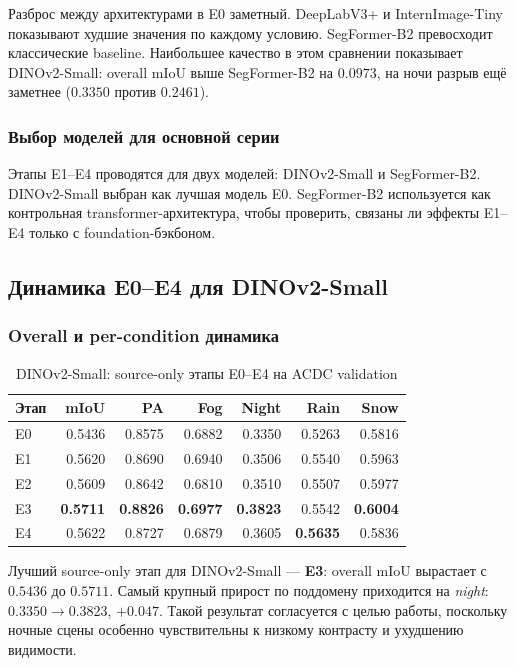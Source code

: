 \documentclass[14pt,a4paper]{extarticle}
\begin{document}
Разброс между архитектурами в E0 заметный. DeepLabV3+ и InternImage-Tiny показывают худшие значения по каждому условию. SegFormer-B2 превосходит классические baseline. Наибольшее качество в этом сравнении показывает DINOv2-Small: overall mIoU выше SegFormer-B2 на $0.0973$, на ночи разрыв ещё заметнее ($0.3350$ против $0.2461$).

\subsubsection{Выбор моделей для основной серии}

Этапы E1--E4 проводятся для двух моделей: DINOv2-Small и SegFormer-B2. DINOv2-Small выбран как лучшая модель E0. SegFormer-B2 используется как контрольная transformer-архитектура, чтобы проверить, связаны ли эффекты E1--E4 только с foundation-бэкбоном.

\subsection{Динамика E0--E4 для DINOv2-Small}

\subsubsection{Overall и per-condition динамика}

\begin{table}[H]
    \centering
    \caption{DINOv2-Small: source-only этапы E0--E4 на ACDC validation}
    \label{tab:dinov2_e0_e4_metrics}
    \small
    \begin{tabular}{lrrrrrr}
        \toprule
        Этап & mIoU & PA & Fog & Night & Rain & Snow \\
        \midrule
        E0 & 0.5436 & 0.8575 & 0.6882 & 0.3350 & 0.5263 & 0.5816 \\
        E1 & 0.5620 & 0.8690 & 0.6940 & 0.3506 & 0.5540 & 0.5963 \\
        E2 & 0.5609 & 0.8642 & 0.6810 & 0.3510 & 0.5507 & 0.5977 \\
        E3 & \textbf{0.5711} & \textbf{0.8826} & \textbf{0.6977} & \textbf{0.3823} & 0.5542 & \textbf{0.6004} \\
        E4 & 0.5622 & 0.8727 & 0.6879 & 0.3605 & \textbf{0.5635} & 0.5836 \\
        \bottomrule
    \end{tabular}
\end{table}

Лучший source-only этап для DINOv2-Small --- \textbf{E3}: overall mIoU вырастает с $0.5436$ до $0.5711$. Самый крупный прирост по поддомену приходится на \textit{night}: $0.3350 \to 0.3823$, $+0.047$. Такой результат согласуется с целью работы, поскольку ночные сцены особенно чувствительны к низкому контрасту и ухудшению видимости.
\end{document}
